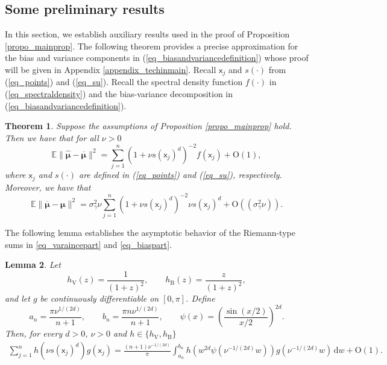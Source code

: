 \documentclass[11pt]{article}
\newtheorem{theorem}{Theorem}[section]
\newtheorem{lemma}[theorem]{Lemma}
\newcommand{\OO}{\mathrm{O}}
\newcommand{\sfx}{\mathsf{x}}
\numberwithin{equation}{section}
\numberwithin{figure}{section}
\begin{document}
\subsection{Some preliminary results}
In this section, we establish auxiliary results used in the proof of Proposition \ref{propo_mainprop}. The following theorem provides a precise approximation for the bias and variance components in (\ref{eq_biasandvariancedefinition}) whose proof will be given in Appendix \ref{appendix_techinmain}. Recall $\sfx_j$ and $s(\cdot)$ from (\ref{eq_points}) and (\ref{eq_su}).
Recall the spectral density function $f(\cdot)$ in (\ref{eq_spectraldensity}) and the bias-variance decomposition in (\ref{eq_biasandvariancedefinition}). 
\begin{theorem}\label{thm_maintechinicaltheorem}
Suppose the assumptions of Proposition \ref{propo_mainprop} hold. Then we have that for all $\nu>0$
\begin{equation}\label{eq_varaincepart}
 \mathbb{E}\|\widehat{\bm{\mu}}-\overline{\bm{\mu}}\|^{2}=\sum_{j=1}^n (1+\nu
s(\sfx_{j})^{d})^{-2}f(\sfx_{j})+\OO(1),   
\end{equation}
where $\sfx_j$ and $s(\cdot)$ are defined in (\ref{eq_points}) and (\ref{eq_su}), respectively. Moreover, we have that 
\begin{equation}\label{eq_biaspart}
\mathbb{E}\|\overline{\bm{\mu}}-\bm{\mu} \|^{2}=\sigma _{\gamma }^{2}\nu \sum_{j=1}^n
(1+\nu s(\sfx_{j})^{d})^{-2}\nu s(\sfx_{j})^{d} +\OO((\sigma _{\gamma }^{2}\nu )).
\end{equation}
\end{theorem}

The following lemma establishes the asymptotic behavior of the Riemann-type sums in \eqref{eq_varaincepart} and \eqref{eq_biaspart}.

\begin{lemma}
\label{lemma_general_scaled_sum}
Let
\[
h_{\mathrm{V}}(z)=\frac{1}{(1+z)^2},
\qquad
h_{\mathrm{B}}(z)=\frac{z}{(1+z)^2},
\]
and let \(g\) be continuously differentiable on \([0,\pi]\). Define
\begin{equation}\label{eq_someimportantnotations}
a_n=\frac{\pi\nu^{1/(2d)}}{n+1},
\qquad
b_n=\frac{\pi n\nu^{1/(2d)}}{n+1},
\qquad
\psi(x)=\left(\frac{\sin(x/2)}{x/2}\right)^{2d}.
\end{equation}
Then, for every \(d>0\), \(\nu>0\) and
\(h\in\{h_{\mathrm{V}},h_{\mathrm{B}}\}\)
\[
\begin{aligned}
\sum_{j=1}^n h(\nu s(\sfx_j)^d)g(\sfx_j)=
\frac{(n+1)\nu^{-1/(2d)}}{\pi}
\int_{a_n}^{b_n}
h(w^{2d}\psi(\nu^{-1/(2d)}w))
g(\nu^{-1/(2d)}w)\,\mathrm{d}w
+\mathrm{O}(1).
\end{aligned}
\]
\end{lemma}
\end{document}

